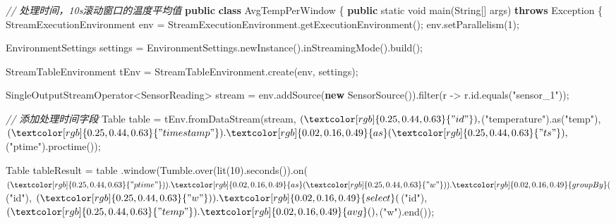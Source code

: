 \documentclass[cn,11pt,chinese]{elegantbook}
\newenvironment{Shaded}{}{}
\newcommand{\BuiltInTok}[1]{#1}
\newcommand{\CommentTok}[1]{\textcolor[rgb]{0.38,0.63,0.69}{\textit{#1}}}
\newcommand{\DataTypeTok}[1]{\textcolor[rgb]{0.56,0.13,0.00}{#1}}
\newcommand{\DecValTok}[1]{\textcolor[rgb]{0.25,0.63,0.44}{#1}}
\newcommand{\FunctionTok}[1]{\textcolor[rgb]{0.02,0.16,0.49}{#1}}
\newcommand{\KeywordTok}[1]{\textcolor[rgb]{0.00,0.44,0.13}{\textbf{#1}}}
\newcommand{\NormalTok}[1]{#1}
\newcommand{\StringTok}[1]{\textcolor[rgb]{0.25,0.44,0.63}{#1}}
\begin{document}
\begin{Shaded}
\begin{Highlighting}[]
\CommentTok{// 处理时间，10s滚动窗口的温度平均值}
\KeywordTok{public} \KeywordTok{class}\NormalTok{ AvgTempPerWindow \{}
    \KeywordTok{public} \DataTypeTok{static} \DataTypeTok{void} \FunctionTok{main}\NormalTok{(}\BuiltInTok{String}\NormalTok{[] args) }\KeywordTok{throws} \BuiltInTok{Exception}\NormalTok{ \{}
\NormalTok{        StreamExecutionEnvironment env = StreamExecutionEnvironment.}\FunctionTok{getExecutionEnvironment}\NormalTok{();}
\NormalTok{        env.}\FunctionTok{setParallelism}\NormalTok{(}\DecValTok{1}\NormalTok{);}

\NormalTok{        EnvironmentSettings settings = EnvironmentSettings.}\FunctionTok{newInstance}\NormalTok{().}\FunctionTok{inStreamingMode}\NormalTok{().}\FunctionTok{build}\NormalTok{();}

\NormalTok{        StreamTableEnvironment tEnv = StreamTableEnvironment.}\FunctionTok{create}\NormalTok{(env, settings);}

\NormalTok{        SingleOutputStreamOperator\textless{}SensorReading\textgreater{} stream = env.}\FunctionTok{addSource}\NormalTok{(}\KeywordTok{new} \FunctionTok{SensorSource}\NormalTok{()).}\FunctionTok{filter}\NormalTok{(r {-}\textgreater{} r.}\FunctionTok{id}\NormalTok{.}\FunctionTok{equals}\NormalTok{(}\StringTok{"sensor\_1"}\NormalTok{));}

        \CommentTok{// 添加处理时间字段}
\NormalTok{        Table table = tEnv.}\FunctionTok{fromDataStream}\NormalTok{(stream, $(}\StringTok{"id"}\NormalTok{), $(}\StringTok{"temperature"}\NormalTok{).}\FunctionTok{as}\NormalTok{(}\StringTok{"temp"}\NormalTok{), $(}\StringTok{"timestamp"}\NormalTok{).}\FunctionTok{as}\NormalTok{(}\StringTok{"ts"}\NormalTok{), $(}\StringTok{"ptime"}\NormalTok{).}\FunctionTok{proctime}\NormalTok{());}

\NormalTok{        Table tableResult = table}
\NormalTok{                .}\FunctionTok{window}\NormalTok{(Tumble.}\FunctionTok{over}\NormalTok{(}\FunctionTok{lit}\NormalTok{(}\DecValTok{10}\NormalTok{).}\FunctionTok{seconds}\NormalTok{()).}\FunctionTok{on}\NormalTok{($(}\StringTok{"ptime"}\NormalTok{)).}\FunctionTok{as}\NormalTok{(}\StringTok{"w"}\NormalTok{))}
\NormalTok{                .}\FunctionTok{groupBy}\NormalTok{($(}\StringTok{"id"}\NormalTok{), $(}\StringTok{"w"}\NormalTok{))}
\NormalTok{                .}\FunctionTok{select}\NormalTok{($(}\StringTok{"id"}\NormalTok{), $(}\StringTok{"temp"}\NormalTok{).}\FunctionTok{avg}\NormalTok{(), $(}\StringTok{"w"}\NormalTok{).}\FunctionTok{end}\NormalTok{());}


\end{Highlighting}
\end{Shaded}
\end{document}
